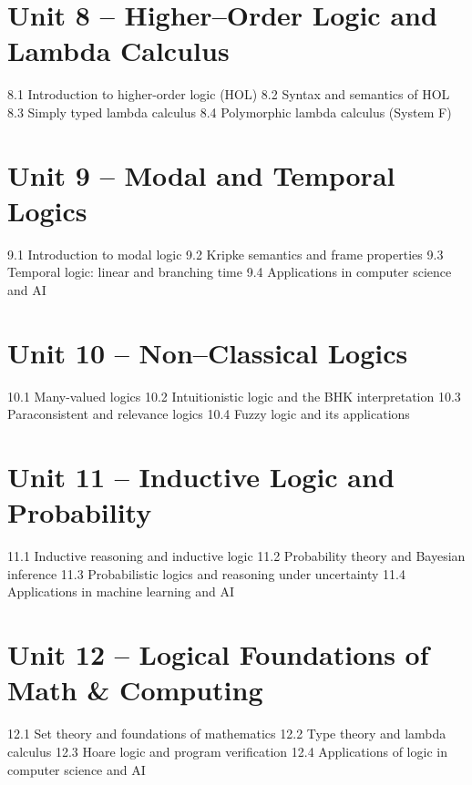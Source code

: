 \section{Unit 8 – Higher–Order Logic and Lambda Calculus}
8.1 Introduction to higher-order logic (HOL)
8.2 Syntax and semantics of HOL
8.3 Simply typed lambda calculus
8.4 Polymorphic lambda calculus (System F)
\section{Unit 9 – Modal and Temporal Logics}
9.1 Introduction to modal logic
9.2 Kripke semantics and frame properties
9.3 Temporal logic: linear and branching time
9.4 Applications in computer science and AI
\section{Unit 10 – Non–Classical Logics}
10.1 Many-valued logics
10.2 Intuitionistic logic and the BHK interpretation
10.3 Paraconsistent and relevance logics
10.4 Fuzzy logic and its applications
\section{Unit 11 – Inductive Logic and Probability}
11.1 Inductive reasoning and inductive logic
11.2 Probability theory and Bayesian inference
11.3 Probabilistic logics and reasoning under uncertainty
11.4 Applications in machine learning and AI
\section{Unit 12 – Logical Foundations of Math \& Computing}
12.1 Set theory and foundations of mathematics
12.2 Type theory and lambda calculus
12.3 Hoare logic and program verification
12.4 Applications of logic in computer science and AI
